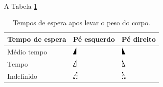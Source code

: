 A Tabela \ref{tab:simbolospe}
\begin{table}[!hbt]
\caption{Tempos de espera apos levar o peso do corpo.}
\begin{center}
\begin{tabular}{|l |l | l |}
\hline
Tempo de espera  & Pé esquerdo & Pé direito \\
\hline
\hline
Médio tempo  & 
\includegraphics[height=11pt]{chapters/cap-partitura/torso-pe-esquerdo-contratempo.eps}   & 
\includegraphics[height=11pt]{chapters/cap-partitura/torso-pe-direito-contratempo.eps}   \\
\hline
Tempo  & 
\includegraphics[height=11pt]{chapters/cap-partitura/torso-pe-esquerdo-tempo.eps}   & 
\includegraphics[height=11pt]{chapters/cap-partitura/torso-pe-direito-tempo.eps}   \\
\hline
Indefinido & 
\includegraphics[height=11pt]{chapters/cap-partitura/torso-pe-esquerdo-indef.eps}   & 
\includegraphics[height=11pt]{chapters/cap-partitura/torso-pe-direito-indef.eps}   \\
\hline
\hline
\end{tabular}
\end{center}
\label{tab:simbolospe}
\end{table}
